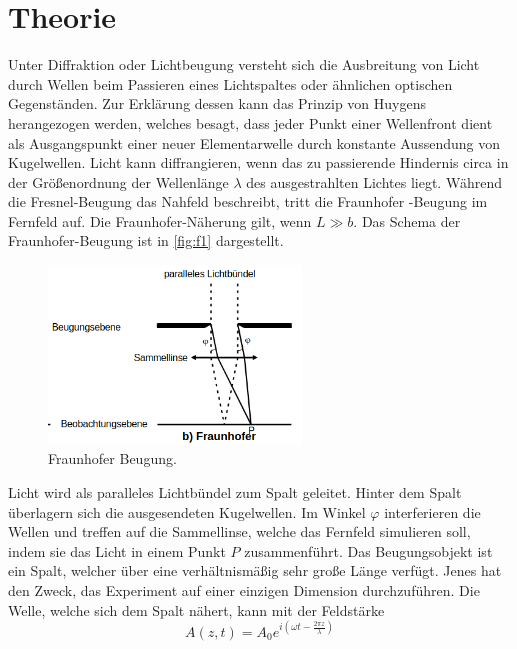 \section{Theorie}
\label{sec:Theorie}

Unter Diffraktion oder Lichtbeugung versteht sich die Ausbreitung von Licht 
durch Wellen beim Passieren eines Lichtspaltes oder ähnlichen optischen 
Gegenständen. Zur Erklärung dessen kann das Prinzip von Huygens herangezogen 
werden, welches besagt, dass jeder Punkt einer Wellenfront dient als 
Ausgangspunkt einer neuer Elementarwelle durch konstante Aussendung von 
Kugelwellen. Licht kann diffrangieren, wenn das zu passierende Hindernis circa 
in der Größenordnung der Wellenlänge $\lambda$ des ausgestrahlten Lichtes 
liegt. Während die Fresnel-Beugung das Nahfeld beschreibt, tritt die Fraunhofer
-Beugung im Fernfeld auf. Die Fraunhofer-Näherung gilt, wenn $L \gg b$. Das
Schema der Fraunhofer-Beugung ist in \autoref{fig:f1} dargestellt.
\begin{figure}[H]
    \centering
        \centering
        \includegraphics[width=0.6\textwidth]{Bilder/Fraunhoferschema.png}
        \caption{Fraunhofer Beugung. \cite{anleitung3}}
    \hfill
    \label{fig:f1}
\end{figure}
\noindent Licht wird als paralleles Lichtbündel zum Spalt geleitet. Hinter dem
Spalt überlagern sich die ausgesendeten Kugelwellen. Im Winkel $\varphi$ interferieren 
die Wellen und treffen auf die Sammellinse, welche das Fernfeld simulieren soll,
indem sie das Licht in einem Punkt $P$ zusammenführt.
\noindent Das Beugungsobjekt ist ein Spalt, welcher über eine verhältnismäßig
sehr große Länge verfügt. Jenes hat den Zweck, das Experiment auf einer einzigen 
Dimension durchzuführen. Die Welle, welche sich dem Spalt nähert, kann mit 
der Feldstärke
\begin{equation}
    \label{eqn:1}
    A(z,t) = A_0 e^{i\left(\omega t - \frac{2 \pi z}{\lambda}\right)}
\end{equation}
